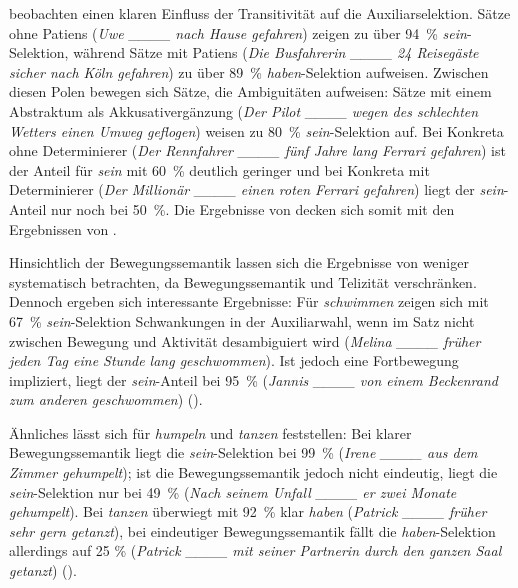 \textcite[127]{Hinze.2007} beobachten einen klaren Einfluss der Transitivität auf die Auxiliarselektion. Sätze ohne Patiens (\textit{Uwe \_\_\_\_ nach Hause gefahren}) zeigen zu über 94~\% \textit{sein}-Selektion, während Sätze mit Patiens (\textit{Die Busfahrerin  \_\_\_\_ 24 Reisegäste sicher nach Köln gefahren}) zu über 89~\% \textit{haben}-Selektion aufweisen. Zwischen diesen Polen bewegen sich Sätze, die Ambiguitäten  aufweisen: Sätze mit einem Abstraktum als Akkusativergänzung (\textit{Der Pilot \_\_\_\_ wegen des schlechten Wetters einen Umweg geflogen}) weisen zu 80~\% \textit{sein}-Selektion auf. Bei Konkreta ohne Determinierer (\textit{Der Rennfahrer  \_\_\_\_ fünf Jahre lang Ferrari gefahren}) ist der Anteil für \textit{sein} mit 60~\% deutlich geringer und bei Konkreta mit Determinierer (\textit{Der Millionär  \_\_\_\_ einen roten Ferrari gefahren}) liegt der \textit{sein}-Anteil nur noch bei 50~\%. Die Ergebnisse von \textcite{Hinze.2007} decken sich somit mit den Ergebnissen von \textcite{Gillmann.2016}.



Hinsichtlich der Bewegungssemantik lassen sich die Ergebnisse von \textcite{Hinze.2007} weniger systematisch betrachten, da \textcite[105]{Hinze.2007} Bewegungssemantik und Telizität verschränken. Dennoch ergeben sich interessante Ergebnisse: Für \textit{schwimmen} zeigen sich mit 67~\% \textit{sein}-Selektion Schwankungen in der Auxiliarwahl, wenn im Satz nicht zwischen Bewegung und Aktivität desambiguiert wird (\textit{Melina  \_\_\_\_ früher jeden Tag eine Stunde lang geschwommen}). Ist jedoch eine Fortbewegung impliziert, liegt der \textit{sein}-Anteil bei 95~\% (\textit{Jannis  \_\_\_\_ von einem Beckenrand zum anderen geschwommen}) (\cite[112--113]{Hinze.2007}). 



Ähnliches lässt sich für \textit{humpeln} und \textit{tanzen} feststellen: Bei klarer Bewegungssemantik liegt die \textit{sein}-Selektion bei 99~\% (\textit{Irene  \_\_\_\_ aus dem Zimmer gehumpelt}); ist die Bewegungssemantik jedoch nicht eindeutig, liegt die \textit{sein}-Selektion nur bei 49~\% (\textit{Nach seinem Unfall \_\_\_\_ er zwei Monate gehumpelt}). Bei \textit{tanzen} überwiegt mit 92~\% klar \textit{haben} (\textit{Patrick \_\_\_\_ früher sehr gern getanzt}), bei eindeutiger Bewegungssemantik fällt die \textit{haben}-Selektion allerdings auf 25 \% (\textit{Patrick  \_\_\_\_ mit seiner Partnerin durch den ganzen Saal getanzt}) (\cite[112--113]{Hinze.2007}). 

